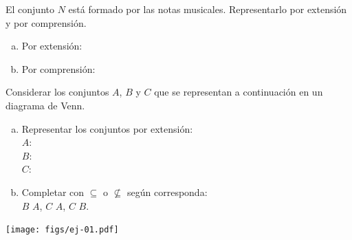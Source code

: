 \documentclass[11pt]{article}
\begin{document}
\begin{exercise}
El conjunto $N$ está formado por las notas musicales. Representarlo por extensión y por comprensión.
\begin{enumerate}[a)]
    \item Por extensión: \blank[width=10cm]{}
    \item Por comprensión: \blank[width=10cm]{}
\end{enumerate}
\end{exercise}

\begin{exercise}
Considerar los conjuntos $A$, $B$ y $C$ que se representan a continuación en un diagrama de Venn. 
\begin{minipage}{0.45\textwidth}
\begin{enumerate}[a)]
    \item Representar los conjuntos por extensión:\\[0.5em]
        $A$: \blank[width=4cm]{} \\[0.5em]
        $B$: \blank[width=4cm]{} \\[0.5em]
        $C$: \blank[width=4cm]{} 
    \item Completar con $\subseteq$ o $\nsubseteq$ según corresponda: \\[0.5em]
        $B$ \blank{} $A$, $C$ \blank{} $A$, $C$ \blank{} $B$.
\end{enumerate}

\end{minipage}
\hfill
\begin{minipage}{0.45\textwidth}
    \begin{center}
        \texttt{[image: figs/ej-01.pdf]}
    \end{center}
\end{minipage}
\end{exercise}
\end{document}
